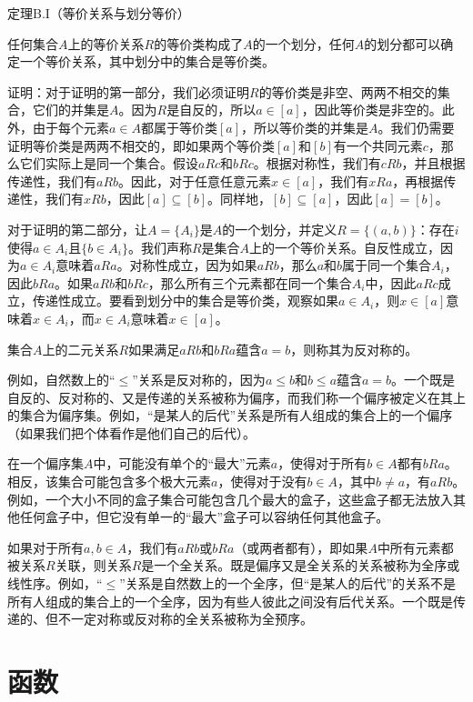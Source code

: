 \documentclass[lang=cn,newtx,10pt,scheme=chinese]{elegantbook}
\begin{document}
定理B.I（等价关系与划分等价）

任何集合$A$上的等价关系$R$的等价类构成了$A$的一个划分，任何$A$的划分都可以确定一个等价关系，其中划分中的集合是等价类。

证明：对于证明的第一部分，我们必须证明$R$的等价类是非空、两两不相交的集合，它们的并集是$A$。因为$R$是自反的，所以$a \in[a]$，因此等价类是非空的。此外，由于每个元素$a \in A$都属于等价类$[a]$，所以等价类的并集是$A$。我们仍需要证明等价类是两两不相交的，即如果两个等价类$[a]$和$[b]$有一个共同元素$c$，那么它们实际上是同一个集合。假设$a R c$和$b R c$。根据对称性，我们有$c R b$，并且根据传递性，我们有$a R b$。因此，对于任意任意元素$x \in[a]$，我们有$x R a$，再根据传递性，我们有$x R b$，因此$[a] \subseteq[b]$。同样地，$[b] \subseteq[a]$，因此$[a]=[b]$。

对于证明的第二部分，让$A=\{A_i\}$是$A$的一个划分，并定义$R=\{(a, b)\}$：存在$i$使得$a \in A_i$且$\{b \in A_i\}$。我们声称$R$是集合$A$上的一个等价关系。自反性成立，因为$a \in A_i$意味着$a R a$。对称性成立，因为如果$a R b$，那么$a$和$b$属于同一个集合$A_i$，因此$b R a$。如果$a R b$和$b R c$，那么所有三个元素都在同一个集合$A_i$中，因此$a R c$成立，传递性成立。要看到划分中的集合是等价类，观察如果$a \in A_i$，则$x \in[a]$意味着$x \in A_i$，而$x \in A_i$意味着$x \in[a]$。

集合$A$上的二元关系$R$如果满足$a R b$和$b R a$蕴含$a=b$，则称其为反对称的。

例如，自然数上的“$\leq$”关系是反对称的，因为$a \leq b$和$b \leq a$蕴含$a=b$。一个既是自反的、反对称的、又是传递的关系被称为偏序，而我们称一个偏序被定义在其上的集合为偏序集。例如，“是某人的后代”关系是所有人组成的集合上的一个偏序（如果我们把个体看作是他们自己的后代）。

在一个偏序集$A$中，可能没有单个的“最大”元素$a$，使得对于所有$b \in A$都有$b R a$。相反，该集合可能包含多个极大元素$a$，使得对于没有$b \in A$，其中$b \neq a$，有$a R b$。例如，一个大小不同的盒子集合可能包含几个最大的盒子，这些盒子都无法放入其他任何盒子中，但它没有单一的“最大”盒子可以容纳任何其他盒子。

如果对于所有$a, b \in A$，我们有$a R b$或$b R a$（或两者都有），即如果$A$中所有元素都被关系$R$关联，则关系$R$是一个全关系。既是偏序又是全关系的关系被称为全序或线性序。例如，“$\leq$”关系是自然数上的一个全序，但“是某人的后代”的关系不是所有人组成的集合上的一个全序，因为有些人彼此之间没有后代关系。一个既是传递的、但不一定对称或反对称的全关系被称为全预序。

\section{函数}
\end{document}
